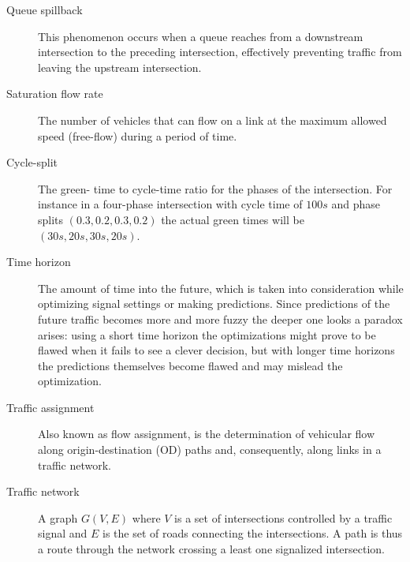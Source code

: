 \begin{description}
\item[Queue spillback] This phenomenon occurs when a queue reaches from a downstream intersection to the preceding intersection, effectively preventing traffic from leaving the upstream intersection.

\item[Saturation flow rate] The number of vehicles that can flow on a link at the maximum allowed speed (free-flow) during a period of time.

	\item[Cycle-split] The green- time to cycle-time ratio for the phases of the intersection. For instance in a four-phase intersection with cycle time of $100s$ and phase splits $\left( 0.3, 0.2, 0.3, 0.2 \right)$ the actual green times will be $\left( 30s, 20s, 30s, 20s \right)$.	

\item[Time horizon] The amount of time into the future, which is taken into consideration while optimizing signal settings or making predictions. Since predictions of the future traffic becomes more and more fuzzy the deeper one looks a paradox arises: using a short time horizon the optimizations might prove to be flawed when it fails to see a clever decision, but with longer time horizons the predictions themselves become flawed and may mislead the optimization.

	\item[Traffic assignment] Also known as flow assignment, is the determination of vehicular flow along origin-destination (OD) paths and, consequently, along links in a traffic network. 

\item[Traffic network] A graph $G(V,E)$ where $V$ is a set of intersections controlled by a traffic signal and $E$ is the set of roads connecting the intersections. A path is thus a route through the network crossing a least one signalized intersection.


\end{description}
